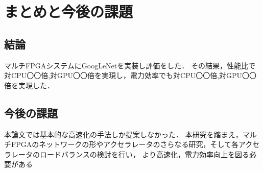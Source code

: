 \chapter{まとめと今後の課題}
{
\label{chap:conclusion}
\section{結論}
\label{sec:conclusion}
マルチFPGAシステムにGoogLeNetを実装し評価をした．
その結果，性能比で対CPU〇〇倍,対GPU〇〇倍を実現し，電力効率でも対CPU〇〇倍,対GPU〇〇倍を実現した．

\section{今後の課題}
\label{sec:future}
本論文では基本的な高速化の手法しか提案しなかった．
本研究を踏まえ，マルチFPGAのネットワークの形やアクセラレータのさらなる研究，そして各アクセラレータのロードバランスの検討を行い，
より高速化，電力効率向上を図る必要がある
}

